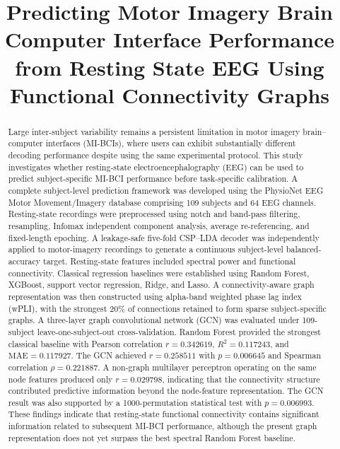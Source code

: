 \documentclass[conference]{IEEEtran}
\begin{document}
\title{Predicting Motor Imagery Brain Computer Interface Performance from Resting State EEG Using Functional Connectivity Graphs}

\author{
}

\maketitle

\begin{abstract}
Large inter-subject variability remains a persistent limitation in motor imagery brain--computer interfaces (MI-BCIs), where users can exhibit substantially different decoding performance despite using the same experimental protocol. This study investigates whether resting-state electroencephalography (EEG) can be used to predict subject-specific MI-BCI performance before task-specific calibration. A complete subject-level prediction framework was developed using the PhysioNet EEG Motor Movement/Imagery database comprising 109 subjects and 64 EEG channels. Resting-state recordings were preprocessed using notch and band-pass filtering, resampling, Infomax independent component analysis, average re-referencing, and fixed-length epoching. A leakage-safe five-fold CSP--LDA decoder was independently applied to motor-imagery recordings to generate a continuous subject-level balanced-accuracy target. Resting-state features included spectral power and functional connectivity. Classical regression baselines were established using Random Forest, XGBoost, support vector regression, Ridge, and Lasso. A connectivity-aware graph representation was then constructed using alpha-band weighted phase lag index (wPLI), with the strongest 20\% of connections retained to form sparse subject-specific graphs. A three-layer graph convolutional network (GCN) was evaluated under 109-subject leave-one-subject-out cross-validation. Random Forest provided the strongest classical baseline with Pearson correlation $r = 0.342619$, $R^2 = 0.117243$, and $\text{MAE} = 0.117927$. The GCN achieved $r = 0.258511$ with $p = 0.006645$ and Spearman correlation $\rho = 0.221887$. A non-graph multilayer perceptron operating on the same node features produced only $r = 0.029798$, indicating that the connectivity structure contributed predictive information beyond the node-feature representation. The GCN result was also supported by a 1000-permutation statistical test with $p = 0.006993$. These findings indicate that resting-state functional connectivity contains significant information related to subsequent MI-BCI performance, although the present graph representation does not yet surpass the best spectral Random Forest baseline.
\end{abstract}
\end{document}
